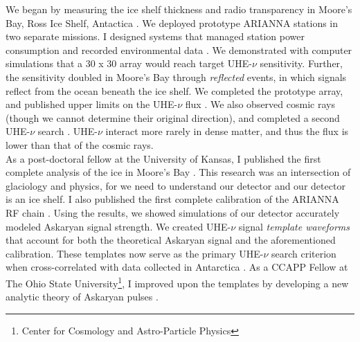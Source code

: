 \documentclass[../../main.tex]{subfiles}
\begin{document}
We began by measuring the ice shelf thickness and radio transparency in Moore's Bay, Ross Ice Shelf, Antactica \cite{icrc}.  We deployed prototype ARIANNA stations in two separate missions.  I designed systems that managed station power consumption and recorded environmental data \cite{10.1109/tns.2015.2468182} \cite{10.1016/j.nima.2010.09.032}.  We demonstrated with computer simulations that a 30 x 30 array would reach target UHE-$\nu$ sensitivity.  Further, the sensitivity doubled in Moore's Bay through \textit{reflected} events, in which signals reflect from the ocean beneath the ice shelf.  We completed the prototype array, and published upper limits on the UHE-$\nu$ flux \cite{10.1016/j.astropartphys.2015.04.002}.  We also observed cosmic rays \cite{cr} (though we cannot determine their original direction), and completed a second UHE-$\nu$ search \cite{4_5}.  UHE-$\nu$ interact more rarely in dense matter, and thus the flux is lower than that of the cosmic rays.
\\
\vspace{0.25cm}
As a post-doctoral fellow at the University of Kansas, I published the first complete analysis of the ice in Moore's Bay \cite{10.3189/2015jog14j214}.  This research was an intersection of glaciology and physics, for we need to understand our detector and our detector is an ice shelf.  I also published the first complete calibration of the ARIANNA RF chain \cite{10.1016/j.astropartphys.2014.09.002}. Using the results, we showed simulations of our detector accurately modeled Askaryan signal strength.  We created UHE-$\nu$ signal \textit{template waveforms} that account for both the theoretical Askaryan signal and the aforementioned calibration.  These templates now serve as the primary UHE-$\nu$ search criterion when cross-correlated with data collected in Antarctica \cite{10.1016/j.astropartphys.2015.04.002} \cite{4_5}.  As a CCAPP Fellow at The Ohio State University\footnote{Center for Cosmology and Astro-Particle Physics}, I improved upon the templates by developing a new analytic theory of Askaryan pulses \cite{10.1016/j.astropartphys.2017.03.008}.
\\
\vspace{0.25cm}
\end{document}
